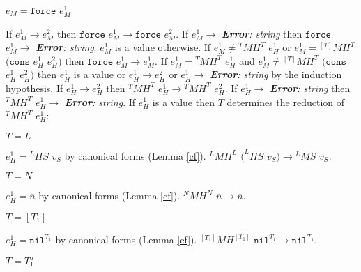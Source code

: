 \begin{case}

$e_{M}=\mathtt{force}$ $e_{M}^{1}$

If $e_{M}^{1}\rightarrow e_{M}^{2}$ then $\mathtt{force}$ $e_{M}^{1}\rightarrow\mathtt{force}$ $e_{M}^{2}$.  If $e_{M}^{1}\rightarrow$ \emph{\textbf{Error}: string} then $\mathtt{force}$ $e_{M}^{1}\rightarrow$ \emph{\textbf{Error}: string}.  $e_{M}^{1}$ is a value otherwise.  If $e_{M}^{1}\neq{^{T}M}H^{T}$ $e_{H}^{1}$ or $e_{M}^{1}={^{[T]}M}H^{T}$ $(\mathtt{cons}$ $e_{H}^{1}$ $e_{H}^{2})$ then $\mathtt{force}$ $e_{M}^{1}\rightarrow e_{M}^{1}$.  If $e_{M}^{1}={^{T}M}H^{T}$ $e_{H}^{1}$ and $e_{M}^{1}\neq{^{[T]}M}H^{T}$ $(\mathtt{cons}$ $e_{H}^{1}$ $e_{H}^{2})$ then $e_{H}^{1}$ is a value or $e_{H}^{1}\rightarrow e_{H}^{2}$ or $e_{H}^{1}\rightarrow$ \emph{\textbf{Error}: string} by the induction hypothesis.  If $e_{H}^{1}\rightarrow e_{H}^{2}$ then $^{T}MH^{T}$ $e_{H}^{1}\rightarrow{^{T}M}H^{T}$ $e_{H}^{2}$.  If $e_{H}^{1}\rightarrow$ \emph{\textbf{Error}: string} then $^{T}MH^{T}$ $e_{H}^{1}\rightarrow$ \emph{\textbf{Error}: string}.  If $e_{H}^{1}$ is a value then $T$ determines the reduction of $^{T}MH^{T}$ $e_{H}^{1}$:

\begin{subcase}

$T=L$

$e_{H}^{1}={^{L}H}S$ $v_{S}$ by canonical forms (Lemma \ref{cf}).  $^{L}MH^{L}$ $(^{L}HS$ $v_{S})\rightarrow{^{L}M}S$ $v_{S}$.

\end{subcase}

\begin{subcase}

$T=N$

$e_{H}^{1}=\overline{n}$ by canonical forms (Lemma \ref{cf}).  $^{N}MH^{N}$ $\overline{n}\rightarrow\overline{n}$.

\end{subcase}

\begin{subcase}

$T=[T_{1}]$

$e_{H}^{1}=\mathtt{nil}^{T_{1}}$ by canonical forms (Lemma \ref{cf}).  $^{[T_{1}]}MH^{[T_{1}]}$ $\mathtt{nil}^{T_{1}}\rightarrow\mathtt{nil}^{T_{1}}$.

\end{subcase}

\begin{subcase}

$T=T_{1}^{a}$


\end{subcase}
\end{case}
